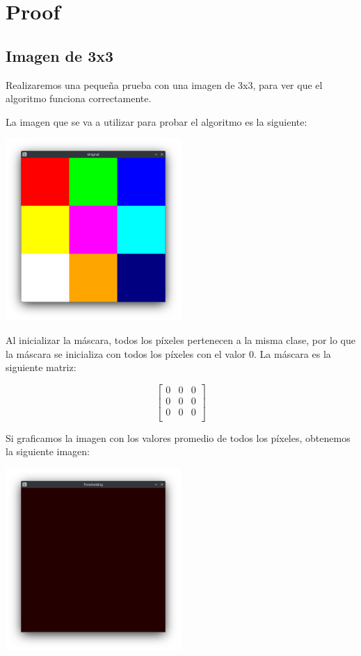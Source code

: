\section{Proof}\label{sec:proof}

\subsection{Imagen de 3x3}\label{subsec:imagen-de-3x3}

Realizaremos una pequeña prueba con una imagen de 3x3, para ver que el algoritmo funciona correctamente.

La imagen que se va a utilizar para probar el algoritmo es la siguiente:

\includegraphics[width=0.5\textwidth]{./latex/img/original}

Al inicializar la máscara, todos los píxeles pertenecen a la misma clase, por lo que la máscara se inicializa con todos los píxeles con el valor 0.
La máscara es la siguiente matriz:

\begin{equation*}
    \begin{bmatrix}
        0 & 0 & 0 \\
        0 & 0 & 0 \\
        0 & 0 & 0 \\
    \end{bmatrix}
\end{equation*}

Si graficamos la imagen con los valores promedio de todos los píxeles, obtenemos la siguiente imagen:

\includegraphics[width=0.5\textwidth]{./latex/img/m0}

